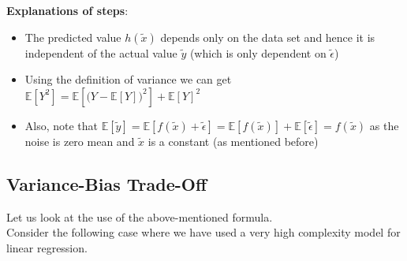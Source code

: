 \documentclass{report}
\newcommand{\xt}{\tilde{x}}
\newcommand{\yt}{\tilde{y}}
\newcommand{\expe}[1]{\mathbb{E}\left[#1\right]}
\begin{document}
\begin{mdframed}
  \textbf{Explanations of steps}:
  \begin{itemize}
    \item The predicted value $h(\xt)$ depends only on the data set and hence it is independent of the actual value $\yt$ (which is only dependent on $\widetilde{\epsilon}$)
    \item Using the definition of variance we can get $\expe{Y^2} = \expe{\bigl(Y-\expe{Y}\bigr)^2} + \expe{Y}^2$
    \item Also, note that $\expe{\yt} = \expe{f(\xt)+\widetilde{\epsilon}} = \expe{f(\xt)}+\expe{\widetilde{\epsilon}} = f(\xt)$ as the noise is zero mean and $\xt$ is a constant (as mentioned before)
  \end{itemize}
\end{mdframed}

\pagebreak
\subsection{Variance-Bias Trade-Off}

Let us look at the use of the above-mentioned formula. \\

Consider the following case where we have used a very high complexity model for linear regression.
\end{document}
